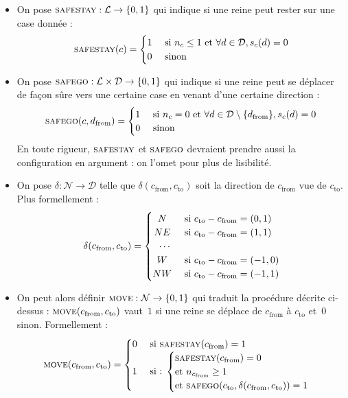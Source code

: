 \documentclass[11pt, openany, a4paper]{article}
\newcommand{\La}{\mathcal{L}}
\newcommand{\Ne}{\mathcal{N}}
\newcommand{\D}{\mathcal{D}}
\newcommand{\Ss}{\textsc{safestay}}
\newcommand{\Sg}{\textsc{safego}}
\newcommand{\M}{\textsc{move}}
\begin{document}
 \begin{itemize}
  \item{On pose $\Ss : {\La}\to\{0,1\}$ qui indique si une reine peut rester sur une case donnée : \[
 \Ss(c) =
  \begin{cases} 
      \hfill 1    \hfill & \text{ si $n_c\leq 1$ et $\forall d \in \D, s_c(d)=0$} \\
      \hfill 0 \hfill & \text{ sinon} \\
  \end{cases}
\]}
 
  \item{On pose $\Sg :  {\La\times\D}\to\{0,1\}$ qui indique si une reine peut se déplacer de façon sûre vers une certaine case en venant d'une certaine direction : \[
 \Sg(c, d_{\mathrm {from}}) =
  \begin{cases} 
      \hfill 1    \hfill & \text{ si $n_c=0$ et $\forall d \in \D\setminus\{d_{\mathrm{from}}\}, s_c(d)=0$} \\
      \hfill 0 \hfill & \text{ sinon} \\
  \end{cases}
\]
 En toute rigueur, $\Ss$ et $\Sg$ devraient prendre aussi la configuration en argument : on l'omet pour plus de lisibilité.
}
\medskip
  \item{On pose $\delta :\Ne\to\D$ telle que $\delta(c_{\mathrm{from}}, c_{\mathrm{to}})$ soit la direction de $c_{\mathrm{from}}$ vue de $c_{\mathrm{to}}$. Plus formellement : \[
 \delta(c_{\mathrm{from}}, c_{\mathrm{to}}) =
  \begin{cases} 
    \hfill N    \hfill & \text{ si $c_{\mathrm{to}}-c_{\mathrm{from}}=(0,1)$} \\
    \hfill NE \hfill & \text{ si  $c_{\mathrm{to}}-c_{\mathrm{from}}=(1,1)$} \\
    \hfill \cdots & \\
    \hfill W \hfill & \text{ si  $c_{\mathrm{to}}-c_{\mathrm{from}}= (-1,0)$}\\
    \hfill NW \hfill & \text { si  $c_{\mathrm{to}}-c_{\mathrm{from}}=(-1,1)$}\\
  \end{cases}
\] }
  \item{On peut alors définir $\M :{\Ne}\to\{0,1\}$ qui traduit la procédure décrite ci-dessus : $\M(c_{\mathrm{from}}, c_{\mathrm{to}})$ vaut~$1$ si une reine se déplace de $c_{\mathrm{from}}$ à $c_{\mathrm{to}}$ et~$0$ sinon. Formellement : \[
    \M(c_{\mathrm{from}}, c_{\mathrm{to}}) = 
    \begin{cases}
      \hfill 0 \hfill & \text{ si $\Ss(c_{\mathrm{from}})=1$} \\
      \hfill 1 \hfill & \text{ si : }{ \begin{cases} \Ss(c_{\mathrm{from}})=0 \\\text{et $n_{c_{\mathrm{from}}}\geq 1$} \\ \text{et } \Sg(c_{\mathrm{to}}, \delta(c_{\mathrm{from}}, c_{\mathrm{to}}))=1\\ \end{cases}}\\


\end{cases}\]}
\end{itemize}
\end{document}
